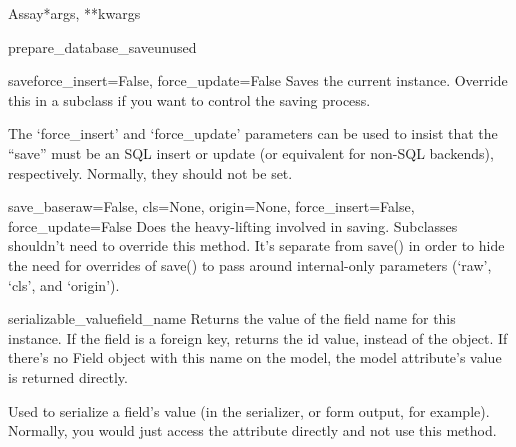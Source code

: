 \documentclass[letterpaper,10pt,english]{sphinxmanual}
\begin{document}
\begin{classdesc}{Assay}{*args, **kwargs}
\hypertarget{data.models.Assay.prepare_database_save}{}\begin{methoddesc}[Assay]{prepare\_database\_save}{unused}\end{methoddesc}

\hypertarget{data.models.Assay.save}{}\begin{methoddesc}[Assay]{save}{force\_insert=False, force\_update=False}
Saves the current instance. Override this in a subclass if you want to
control the saving process.

The `force\_insert' and `force\_update' parameters can be used to insist
that the ``save'' must be an SQL insert or update (or equivalent for
non-SQL backends), respectively. Normally, they should not be set.
\end{methoddesc}

\hypertarget{data.models.Assay.save_base}{}\begin{methoddesc}[Assay]{save\_base}{raw=False, cls=None, origin=None, force\_insert=False, force\_update=False}
Does the heavy-lifting involved in saving. Subclasses shouldn't need to
override this method. It's separate from save() in order to hide the
need for overrides of save() to pass around internal-only parameters
(`raw', `cls', and `origin').
\end{methoddesc}

\hypertarget{data.models.Assay.serializable_value}{}\begin{methoddesc}[Assay]{serializable\_value}{field\_name}
Returns the value of the field name for this instance. If the field is
a foreign key, returns the id value, instead of the object. If there's
no Field object with this name on the model, the model attribute's
value is returned directly.

Used to serialize a field's value (in the serializer, or form output,
for example). Normally, you would just access the attribute directly
and not use this method.
\end{methoddesc}
\end{classdesc}
\end{document}
